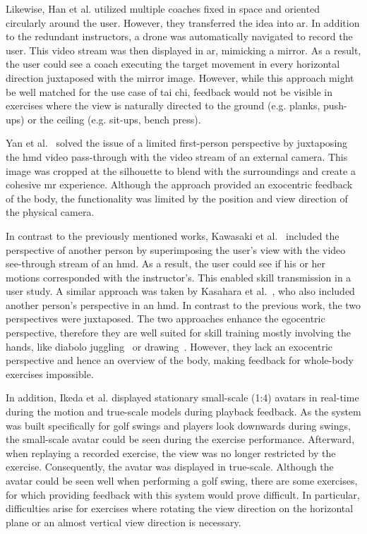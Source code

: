 Likewise, Han et al.\cite{han2017mtc} utilized multiple coaches fixed in space and oriented circularly around the user. However, they transferred the idea into \acrshort{ar}. In addition to the redundant instructors, a drone was automatically navigated to record the user. This video stream was then displayed in \acrshort{ar}, mimicking a mirror. As a result, the user could see a coach executing the target movement in every horizontal direction juxtaposed with the mirror image. However, while this approach might be well matched for the use case of tai chi, feedback would not be visible in exercises where the view is naturally directed to the ground (e.g. planks, push-ups) or the ceiling (e.g. sit-ups, bench press).

Yan et al.~\cite{Yan2015oma} solved the issue of a limited first-person perspective by juxtaposing the \acrshort{hmd} video pass-through with the video stream of an external camera. This image was cropped at the silhouette to blend with the surroundings and create a cohesive \acrshort{mr} experience. Although the approach provided an exocentric feedback of the body, the functionality was limited by the position and view direction of the physical camera.

In contrast to the previously mentioned works, Kawasaki et al.~\cite{kawasaki2010cst} included the perspective of another person by superimposing the user's view with the video see-through stream of an \acrshort{hmd}. As a result, the user could see if his or her motions corresponded with the instructor's. This enabled skill transmission in a user study. A similar approach was taken by Kasahara et al.~\cite{kasahara2016pe}, who also included another person's perspective in an \acrshort{hmd}. In contrast to the previous work, the two perspectives were juxtaposed. The two approaches enhance the egocentric perspective, therefore they are well suited for skill training mostly involving the hands, like diabolo juggling~\cite{kawasaki2010cst} or drawing~\cite{kasahara2016pe}. However, they lack an exocentric perspective and hence an overview of the body, making feedback for whole-body exercises impossible.



In addition, Ikeda et al. \cite{ikeda2018arb} displayed stationary small-scale (1:4) avatars in real-time during the motion and true-scale models during playback feedback. As the system was built specifically for golf swings and players look downwards during swings, the small-scale avatar could be seen during the exercise performance. Afterward, when replaying a recorded exercise, the view was no longer restricted by the exercise. Consequently, the avatar was displayed in true-scale. Although the avatar could be seen well when performing a golf swing, there are some exercises, for which providing feedback with this system would prove difficult. In particular, difficulties arise for exercises where rotating the view direction on the horizontal plane or an almost vertical view direction is necessary.


